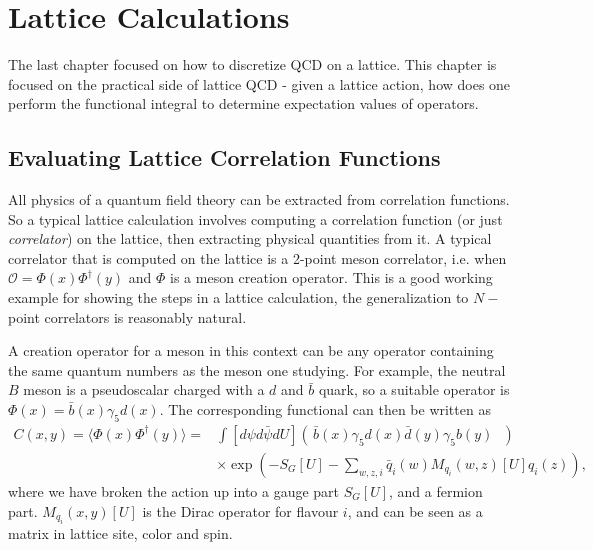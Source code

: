 \chapter{Lattice Calculations}
\label{chap:latticecalculations}

The last chapter focused on how to discretize QCD on a lattice. This chapter is focused on the practical side of lattice QCD - given a lattice action, how does one perform the functional integral to determine expectation values of operators.

\section{Evaluating Lattice Correlation Functions}

All physics of a quantum field theory can be extracted from correlation functions. So a typical lattice calculation involves computing a correlation function (or just {\it{correlator}}) on the lattice, then extracting physical quantities from it. A typical correlator that is computed on the lattice is a 2-point meson correlator, i.e. when $\mathcal{O} = \Phi(x)\Phi^{\dagger}(y)$ and $\Phi$ is a meson creation operator. This is a good working example for showing the steps in a lattice calculation, the generalization to $N-$point correlators is reasonably natural.

A creation operator for a meson in this context can be any operator containing the same quantum numbers as the meson one studying. For example, the neutral $B$ meson is a pseudoscalar charged with a $d$ and $\bar{b}$ quark, so a suitable operator is $\Phi(x) = \bar{b}(x)\gamma_5 d(x)$. The corresponding functional can then be written as
\begin{align}
  \nonumber
  C(x,y) = \langle \Phi(x)\Phi^{\dagger}(y)\rangle =& \int [d\psi d\bar{\psi} dU] \left(\, \bar{b}(x)\gamma_5 d(x) \bar{d}(y)\gamma_5 b(y) \text{ }\right) \\&\times \exp\left(-S_G[U]-\sum_{w,z,i} \bar{q}_i(w)M_{q_i}(w,z)[U]q_i(z)\right),
\end{align}
where we have broken the action up into a gauge part $S_G[U]$, and a fermion part. $M_{q_i}(x,y)[U]$ is the Dirac operator for flavour $i$, and can be seen as a matrix in lattice site, color and spin.

